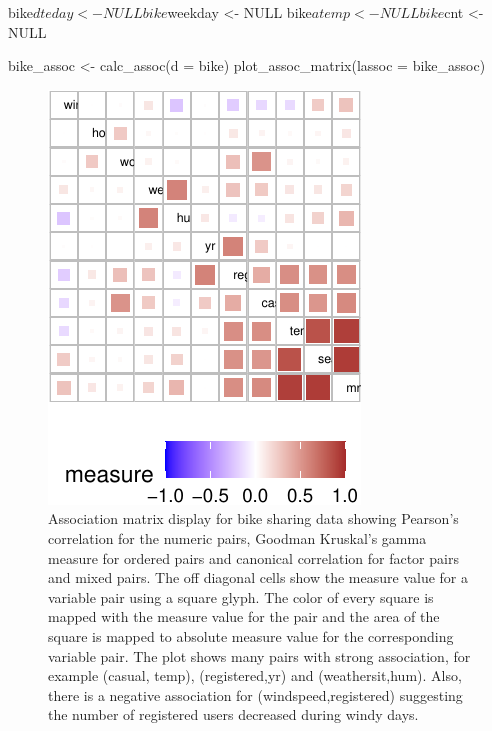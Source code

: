 \begin{Schunk}
\begin{Sinput}
bike$dteday <- NULL 
bike$weekday <- NULL
bike$atemp <- NULL
bike$cnt <- NULL

bike_assoc <- calc_assoc(d = bike)
plot_assoc_matrix(lassoc = bike_assoc)
\end{Sinput}
\begin{figure}

{\centering \includegraphics{rj_paper_files/figure-latex/assoc-matrix-bike-1} 

}

\caption[Association matrix display for bike sharing data showing Pearson's correlation for the numeric pairs, Goodman Kruskal's gamma measure for ordered pairs and canonical correlation for factor pairs and mixed pairs]{Association matrix display for bike sharing data showing Pearson's correlation for the numeric pairs, Goodman Kruskal's gamma measure for ordered pairs and canonical correlation for factor pairs and mixed pairs. The off diagonal cells show the measure value for a variable pair using a square glyph. The color of every square is mapped with the measure value for the pair and the area of the square is mapped to absolute measure value for the corresponding variable pair. The plot shows many pairs with strong association, for example (casual, temp), (registered,yr) and (weathersit,hum). Also, there is a negative association for (windspeed,registered) suggesting the number of registered users decreased during windy days.}\label{fig:assoc-matrix-bike}
\end{figure}
\end{Schunk}

